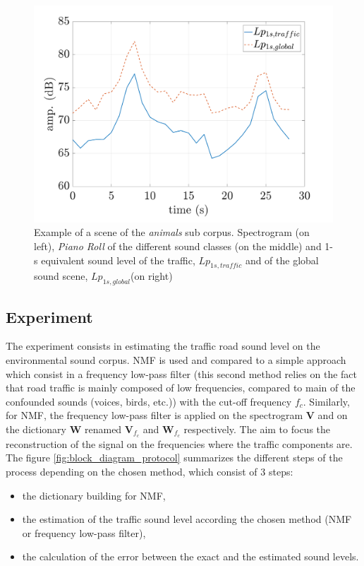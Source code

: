 \documentclass[twocolumn,a4paper,10pt]{article}
\begin{document}
\begin{figure}
\begin{minipage}[c]{.32\linewidth}
      \includegraphics[width =\linewidth]{../image/evolutionLpExample.pdf} 

   \end{minipage}
\caption{Example of a scene of the \textit{animals} sub corpus. Spectrogram (on left), \textit{Piano Roll} of the different sound classes (on the middle) and 1-s equivalent sound level of the traffic, $Lp_{1s,traffic}$ and of the global sound scene, $Lp_{1s,global}$(on right)}
\label{fig:exampleScene}
\end{figure}

\subsection{Experiment}

The experiment consists in estimating the traffic road sound level on the environmental sound corpus. NMF is used and compared to a simple approach which consist in a frequency low-pass filter (this second method relies on the fact that road traffic is mainly composed of low frequencies, compared to main of the confounded sounds (voices, birds, etc.)) with the cut-off frequency $f_c$. Similarly, for NMF, the frequency low-pass filter is applied on the spectrogram $\mathbf{V}$ and on the dictionary $\mathbf{W}$ renamed $\mathbf{V}_{f_c}$ and $\mathbf{W}_{f_c}$ respectively. The aim to focus the reconstruction of the signal on the frequencies where the traffic components are. The figure \ref{fig:block_diagram_protocol} summarizes the different steps of the process depending on the chosen method, which consist of 3 steps: 

\begin{itemize}
\item the dictionary building for NMF,
\item the estimation of the traffic sound level according the chosen method (NMF or frequency low-pass filter),
\item the calculation of the error between the exact and the estimated sound levels.\\
\end{itemize}
\end{document}
